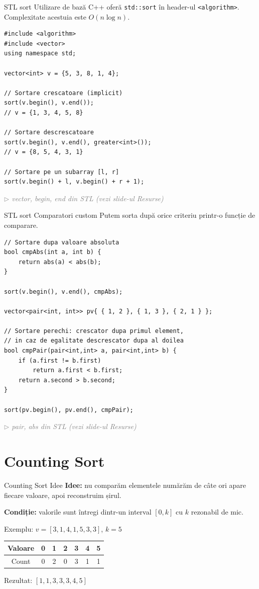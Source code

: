 \documentclass{beamer}
\newcommand{\beginnote}[1]{%
  \vfill
  {\footnotesize\textcolor{gray}{\textit{$\triangleright$ #1 (vezi slide-ul \emph{Resurse})}}}%
}
\begin{document}
\begin{frame}{STL sort \textemdash{} Utilizare de bază}
  C++ oferă \lstinline|std::sort| în header-ul \lstinline|<algorithm>|.
  Complexitate acestuia este $O(n \log n)$.
  \begin{lstlisting}
#include <algorithm>
#include <vector>
using namespace std;

vector<int> v = {5, 3, 8, 1, 4};

// Sortare crescatoare (implicit)
sort(v.begin(), v.end());
// v = {1, 3, 4, 5, 8}

// Sortare descrescatoare
sort(v.begin(), v.end(), greater<int>());
// v = {8, 5, 4, 3, 1}

// Sortare pe un subarray [l, r]
sort(v.begin() + l, v.begin() + r + 1);
  \end{lstlisting}
  \beginnote{vector, begin, end \textemdash{} din STL}
  \end{frame}

\begin{frame}{STL sort \textemdash{} Comparatori custom}
  Putem sorta după orice criteriu printr-o funcție de comparare.
  \begin{lstlisting}
// Sortare dupa valoare absoluta
bool cmpAbs(int a, int b) {
    return abs(a) < abs(b);
}

sort(v.begin(), v.end(), cmpAbs);

vector<pair<int, int>> pv{ { 1, 2 }, { 1, 3 }, { 2, 1 } };

// Sortare perechi: crescator dupa primul element,
// in caz de egalitate descrescator dupa al doilea
bool cmpPair(pair<int,int> a, pair<int,int> b) {
    if (a.first != b.first)
        return a.first < b.first;
    return a.second > b.second;
}

sort(pv.begin(), pv.end(), cmpPair);
  \end{lstlisting}
  \beginnote{pair, abs \textemdash{} din STL}
\end{frame}

\section{Counting Sort}

\begin{frame}{Counting Sort \textemdash{} Idee}
  \textbf{Idee:} nu comparăm elementele \textemdash{} numărăm de câte ori apare fiecare valoare, apoi reconstruim șirul.

  \bigskip
  \textbf{Condiție:} valorile sunt întregi dintr-un interval $[0, k]$ cu $k$ rezonabil de mic.

  \bigskip
  Exemplu: $v = [3, 1, 4, 1, 5, 3, 3]$, $k = 5$
  \begin{center}
  \begin{tabular}{ccccccc}
    \toprule
    Valoare & 0 & 1 & 2 & 3 & 4 & 5 \\
    \midrule
    Count   & 0 & 2 & 0 & 3 & 1 & 1 \\
    \bottomrule
  \end{tabular}
  \end{center}
  \medskip
  Rezultat: $[1, 1, 3, 3, 3, 4, 5]$
\end{frame}
\end{document}
